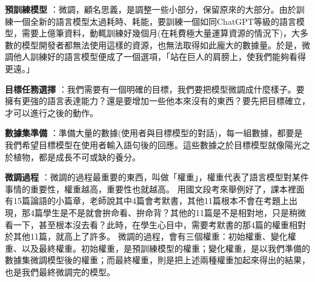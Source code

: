 \documentclass[12pt,a4paper,MingLiU,UTF8,natbib]{article}
\def\xeCJKembold{0.4}
\def\saveCJKnode{\dimen255\lastkern}
\def\restoreCJKnode{\kern-\dimen255\kern\dimen255}
\let\CJKoldsymbol\CJKsymbol
\let\CJKoldpunctsymbol\CJKpunctsymbol
\def\CJKfakeboldsymbol#1{%
	\special{pdf:literal direct 2 Tr \xeCJKembold\space w}%
	\CJKoldsymbol{#1}%
	\saveCJKnode
	\special{pdf:literal direct 0 Tr}%
	\restoreCJKnode}
\def\CJKfakeboldpunctsymbol#1{%
	\special{pdf:literal direct 2 Tr \xeCJKembold\space w}%
	\CJKoldpunctsymbol{#1}%
	\saveCJKnode
	\special{pdf:literal direct 0 Tr}%
	\restoreCJKnode}
\newcommand\CJKfakebold[1]{%
	\let\CJKsymbol\CJKfakeboldsymbol
	\let\CJKpunctsymbol\CJKfakeboldpunctsymbol
	#1%
	\let\CJKsymbol\CJKoldsymbol
	\let\CJKpunctsymbol\CJKoldpunctsymbol}
\begin{document}
	\CJKfakebold{\textbf{預訓練模型}}：微調，顧名思義，是調整一些小部分，保留原來的大部分。由於訓練一個全新的語言模型太過耗時、耗能，要訓練一個如同ChatGPT等級的語言模型，需要上億筆資料，動輒訓練好幾個月(在耗費極大量運算資源的情況下)，大多數的模型開發者都無法使用這樣的資源，也無法取得如此龐大的數據量。於是，微調他人訓練好的語言模型便成了一個選項，「站在巨人的肩膀上，使我們能夠看得更遠。」
	
	\CJKfakebold{\textbf{目標任務選擇}}：我們需要有一個明確的目標，我們要把模型微調成什麼樣子。要擁有更強的語言表達能力？還是要增加一些他本來沒有的東西？要先把目標確立，才可以進行之後的動作。
	
	\CJKfakebold{\textbf{數據集準備}}：準備大量的數據(使用者與目標模型的對話)，每一組數據，都要是我們希望目標模型在使用者輸入語句後的回應。這些數據之於目標模型就像陽光之於植物，都是成長不可或缺的養分。
	
	\CJKfakebold{\textbf{微調過程}}：微調的過程最重要的東西，叫做「權重」，權重代表了語言模型對某件事情的重要性，權重越高，重要性也就越高。
	用國文段考來舉例好了，課本裡面有15篇論語的小篇章，老師說其中4篇會考默書，其他11篇根本不會在考題上出現，那4篇學生是不是就會拚命看、拚命背？其他的11篇是不是相對地，只是稍微看一下，甚至根本沒去看？此時，在學生心目中，需要考默書的那4篇的權重相對於其他11篇，就高上了許多。
	微調的過程，會有三個權重：初始權重、變化權重、以及最終權重。初始權重，是預訓練模型的權重；變化權重，是以我們準備的數據集微調模型後的權重；而最終權重，則是把上述兩種權重加起來得出的結果，也是我們最終微調完的模型。
	
\end{document}
